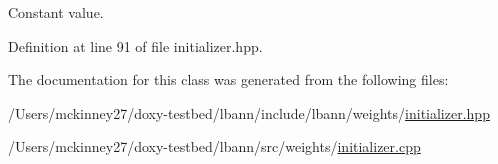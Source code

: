 Constant value. 

Definition at line 91 of file initializer.\+hpp.



The documentation for this class was generated from the following files\+:\begin{DoxyCompactItemize}
\item 
/\+Users/mckinney27/doxy-\/testbed/lbann/include/lbann/weights/\hyperlink{initializer_8hpp}{initializer.\+hpp}\item 
/\+Users/mckinney27/doxy-\/testbed/lbann/src/weights/\hyperlink{initializer_8cpp}{initializer.\+cpp}\end{DoxyCompactItemize}
